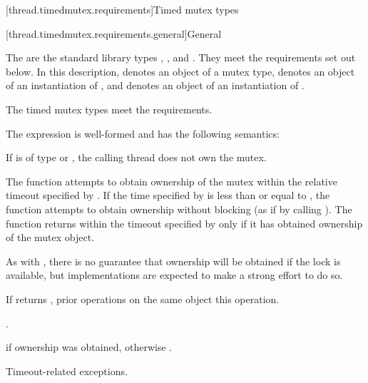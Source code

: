 [thread.timedmutex.requirements]{Timed mutex types}

[thread.timedmutex.requirements.general]{General}

\pnum
The  are the standard library types ,
, and . They
meet the requirements set out below.
In this description,  denotes an object of a mutex type,
 denotes an object of an
instantiation of , and  denotes an
object of an
instantiation of .
\begin{note}
The timed mutex types meet the 
requirements.
\end{note}

\pnum
The expression  is well-formed
and has the following semantics:

\begin{itemdescr}
\pnum
\expects
If  is of type  or
, the calling thread does not
own the mutex.

\pnum
\effects
The function attempts to obtain ownership of the mutex within the
relative timeout
specified by . If the time specified by  is less than or
equal to , the function attempts to obtain ownership without blocking (as if by calling
). The function returns within the timeout specified by
 only if it has obtained ownership of the mutex object.
\begin{note}
As
with , there is no guarantee that ownership will be obtained if the
lock is available, but implementations are expected to make a strong effort to do so.
\end{note}

\pnum
\sync
If  returns , prior  operations
on the same object  this operation.

\pnum
\returntype {}.

\pnum
\returns
{} if ownership was obtained, otherwise .

\pnum
\throws
Timeout-related exceptions.
\end{itemdescr}

